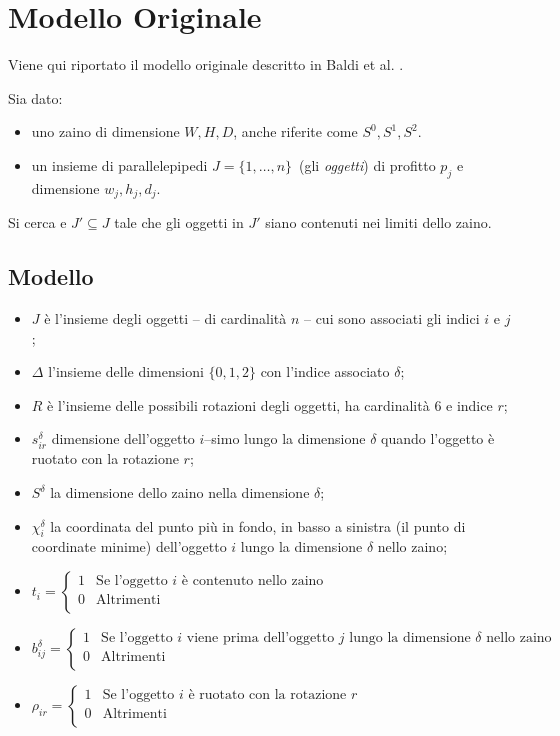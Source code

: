 \documentclass{scrartcl}
\newcommand{\MutliLineEquation}[3]{ 
	\ensuremath{
		#1 = \left\{
		\begin{array}{ll}
		1& \text{#2} \\
		0& \text{#3} \\
		\end{array}
		\right.
	}
}
\begin{document}
\section{Modello Originale}
\label{sec:modello:originale}

Viene qui riportato il modello originale descritto in Baldi et al. \cite{Baldi20129802}.

Sia dato:
\begin{itemize} 
	\item uno zaino di dimensione $W, H, D$, anche riferite come $S^0, S^1, S^2$.
	\item un insieme di parallelepipedi $J = \{1, \dots, n\}$\ (gli \emph{oggetti}) di profitto $p_j$ e dimensione $w_j, h_j, d_j$.
\end{itemize}

Si cerca e $J' \subseteq J$ tale che gli oggetti in $J'$ siano contenuti nei limiti dello zaino.


\subsection{Modello}
\begin{itemize}
	\item $J$ è l'insieme degli oggetti -- di cardinalità $n$ -- cui sono associati gli indici $i$ e $j$;
	\item $\Delta$ l'insieme delle dimensioni $\{0,1,2\}$ con l'indice associato $\delta$;
	\item $R$ è l'insieme delle possibili rotazioni degli oggetti, ha cardinalità $6$ e indice $r$;
	\item $s_{ir}^\delta$ dimensione dell'oggetto $i$--simo lungo la dimensione $\delta$ quando l'oggetto è ruotato con la rotazione $r$;
	\item $S^\delta$ la dimensione dello zaino nella dimensione $\delta$;
	\item $\chi_{i}^\delta$ la coordinata del punto più in fondo, in basso a sinistra  (il punto di coordinate minime) dell'oggetto $i$ lungo la dimensione $\delta$ nello zaino;
	\item \MutliLineEquation{t_{i}}{Se l'oggetto $i$ è contenuto nello zaino}{Altrimenti}
	\item \MutliLineEquation{b_{ij}^\delta}{Se l'oggetto $i$ viene prima dell'oggetto $j$ lungo la dimensione $\delta$ nello zaino}{Altrimenti}
	\item \MutliLineEquation{\rho_{ir}}{Se l'oggetto $i$ è ruotato con la rotazione $r$}{Altrimenti}
\end{itemize}
\end{document}
